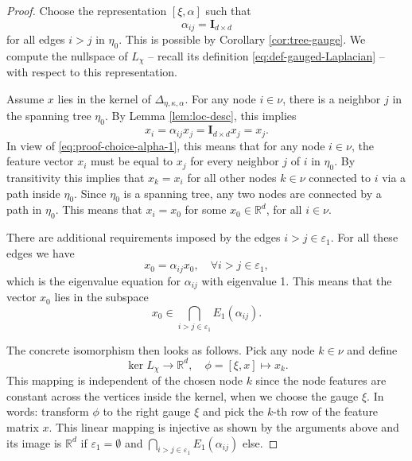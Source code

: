 \documentclass[10pt,reqno]{amsart}
\numberwithin{equation}{section}
\theoremstyle{bfnote}
\theoremstyle{bfdef}
\newcommand{\R}{\mathbb{R}}
\newcommand{\veps}{\varepsilon}
\newcommand{\II}{\mathbf{I}_{d \times d}}
\providecommand\x; %
\renewcommand{\x}{x}
\providecommand\gt; %
\renewcommand{\gt}{\xi}
\providecommand\a; %
\renewcommand{\a}{\alpha}
\providecommand\E; %
\renewcommand{\E}{E}
\providecommand\Lpl; %
\renewcommand{\Lpl}{\Delta}
\providecommand\hgen; %
\renewcommand{\hgen}{L}
\providecommand\vg; %
\renewcommand{\vg}{\chi}
\begin{document}
		\begin{proof}
			Choose the representation $[\gt,\a]$ such that
			\begin{equation}\label{eq:proof-choice-alpha-1}
			\a_{ij} = \II
			\end{equation}
			for all edges $i > j$ in $\eta_{0}$. This is possible by Corollary \ref{cor:tree-gauge}. We compute the nullspace of $L_{\chi}$ -- recall its definition \eqref{eq:def-gauged-Laplacian} -- with respect to this representation.

			 Assume $\x$ lies in the kernel of $\Lpl_{\eta,\kappa,\a}$. For any node $i \in \nu$, there is a neighbor $j$ in the spanning tree $\eta_{0}$. By Lemma \ref{lem:loc-desc}, this implies
			\begin{equation}
				\x_{i} = \a_{ij} \x_{j} = \II \x_{j} = \x_{j}.
			\end{equation}
			In view of \eqref{eq:proof-choice-alpha-1}, this means that for any node $i \in \nu$, the feature vector $\x_{i}$ must be equal to $\x_{j}$ for every neighbor $j$ of $i$ in $\eta_{0}$.
			By transitivity this implies that $\x_k = \x_i$ for all other nodes $k \in \nu$ connected to $i$ via a path inside $\eta_{0}$.
			Since $\eta_0$ is a spanning tree, any two nodes are connected by a path in $\eta_{0}$. This means that $\x_i = \x_0$ for some $\x_{0} \in \R^d$, for all $i \in \nu$.

			There are additional requirements imposed by the edges $i > j \in \veps_{1}$. For all these edges we have
			\begin{equation}
				\x_0 = \a_{ij} \x_0, \quad \forall i > j \in \veps_{1},
			\end{equation}
			which is the eigenvalue equation for $\a_{ij}$ with eigenvalue 1. This means that the vector $\x_0$ lies in the subspace
			\begin{equation}
				\x_0 \in \bigcap_{i > j \in \veps_1} \E_1 (\a_{ij}).
			\end{equation}

			The concrete isomorphism then looks as follows. Pick any node $k \in \nu$ and define
			\begin{equation}
				\ker \hgen_{\vg} \to \R^d, \quad \phi = [\gt,\x ] \mapsto \x_k.
			\end{equation}
			This mapping is independent of the chosen node $k$ since the node features are constant across the vertices inside the kernel, when we choose the gauge $\xi$. In words: transform $\phi$ to the right gauge $\gt$ and pick the $k$-th row of the feature matrix $x$. This linear mapping is injective as shown by the arguments above and its image is $\R^{d}$ if $\veps_1 = \emptyset$ and $\bigcap_{i > j \in \veps_1} E_1(\a_{ij})$ else.
		\end{proof}
\end{document}
